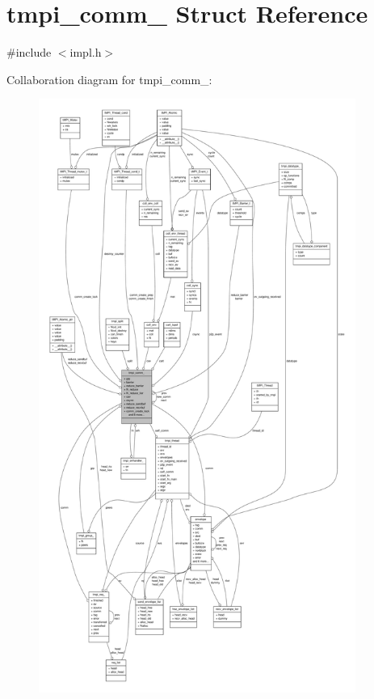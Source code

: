 \hypertarget{structtmpi__comm__}{\section{tmpi\-\_\-comm\-\_\- \-Struct \-Reference}
\label{structtmpi__comm__}
}


{\ttfamily \#include $<$impl.\-h$>$}



\-Collaboration diagram for tmpi\-\_\-comm\-\_\-\-:
\nopagebreak
\begin{figure}[H]
\begin{center}
\leavevmode
\includegraphics[height=550pt]{structtmpi__comm____coll__graph}
\end{center}
\end{figure}
